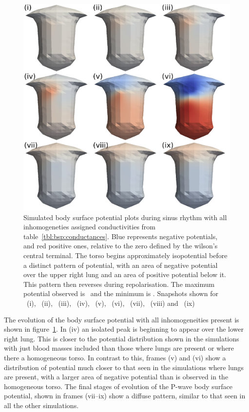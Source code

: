 \begin{figure}
\includegraphics{figures/bsp/bsp_all}
\caption[Body Surface Potential snapshots, with all inhomogeneities]{
\label{bsp:fig:all_bsp}
Simulated body surface potential plots during sinus rhythm with all
inhomogeneties assigned conductivities from table~\ref{tbl:bsp:conductances}.
Blue represents negative potentials, and red positive ones, relative to the zero
defined by the wilson's central terminal.
The torso begins approximately isopotential before a distinct pattern of
potential, with an area of negative potential over the upper right lung and an
area of positive potential below it.
This pattern then reverses during repolarisation.
The maximum potential observed is \ and the minimum is .
Snapshots shown for \ (i), \ (ii), \ (iii), \ (iv),
\ (v), \ (vi), \ (vii), \ (viii) and \
(ix)
}
\end{figure}

The evolution of the body surface potential with all inhomogeneities present is
shown in figure~\ref{bsp:fig:all_bsp}.
In (iv) an isolated peak is beginning to appear over the lower
right lung.
This is closer to the potential distribution shown in the simulations with just
blood masses included than those where lungs are present or where there a
homogeneous torso.
In contrast to this, frames (v) and (vi) show a distribution of potential much
closer to that seen in the simulations where lungs are present, with a larger
area of negative potential than is observed in the homogeneous torso.
The final stages of evolution of the P-wave body surface potential, shown in
frames (vii--ix) show a diffuse pattern, similar to that seen in all the other
simulations.

